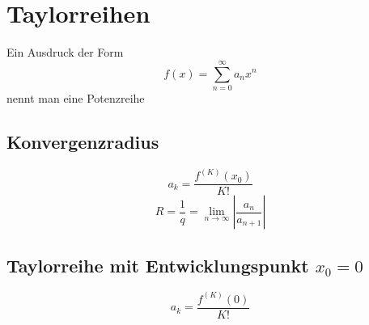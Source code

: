 \section{Taylorreihen}
Ein Ausdruck der Form 
\[ \boxed{f(x) = \sum_{n = 0}^{\infty} a_n x^n} \]
nennt man eine Potenzreihe
\subsection{Konvergenzradius}
\[ \boxed{a_k = \frac{f^{(K)}(x_0)}{K!}} \]
\[ \boxed{R = \frac{1}{q} = \lim_{n \rightarrow \infty} \left| \frac{a_n}{a_{n + 1}} \right|} \]
\subsection{Taylorreihe mit Entwicklungspunkt $x_0 = 0$}
\[ \boxed{a_k = \frac{f^{(K)}(0)}{K!}} \]
